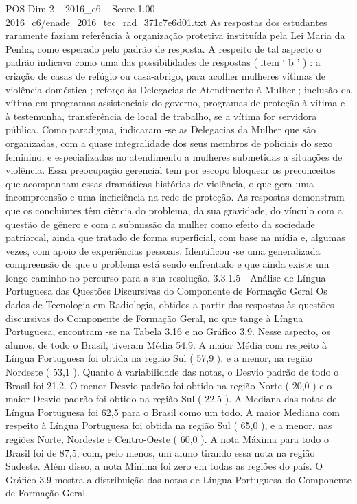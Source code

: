 \begin{textsample}{POS Dim 2 – 2016\_c6 – Score 1.00 – 2016\_c6/enade\_2016\_tec\_rad\_371c7e6d01.txt}
As respostas dos estudantes raramente faziam referência à organização protetiva instituída pela Lei Maria da Penha, como esperado pelo padrão de resposta.
A respeito de tal aspecto o padrão indicava como uma das possibilidades de respostas ( item ‘ b ’ ) : a criação de casas de refúgio ou casa-abrigo, para acolher mulheres vítimas de violência doméstica ; reforço às Delegacias de Atendimento à Mulher ; inclusão da vítima em programas assistenciais do governo, programas de proteção à vítima e à testemunha, transferência de local de trabalho, se a vítima for servidora pública.
Como paradigma, indicaram -se as Delegacias da Mulher que são organizadas, com a quase integralidade dos seus membros de policiais do sexo feminino, e especializadas no atendimento a mulheres submetidas a situações de violência.
Essa preocupação gerencial tem por escopo bloquear os preconceitos que acompanham essas dramáticas histórias de violência, o que gera uma incompreensão e uma ineficiência na rede de proteção.
As respostas demonstram que os concluintes têm ciência do problema, da sua gravidade, do vínculo com a questão de gênero e com a submissão da mulher como efeito da sociedade patriarcal, ainda que tratado de forma superficial, com base na mídia e, algumas vezes, com apoio de experiências pessoais.
Identificou -se uma generalizada compreensão de que o problema está sendo enfrentado e que ainda existe um longo caminho no percurso para a sua resolução. 3.3.1.5 - Análise de Língua Portuguesa das Questões Discursivas do Componente de Formação Geral Os dados de Tecnologia em Radiologia, obtidos a partir das respostas às questões discursivas do Componente de Formação Geral, no que tange à Língua Portuguesa, encontram -se na Tabela 3.16 e no Gráfico 3.9.
Nesse aspecto, os alunos, de todo o Brasil, tiveram Média 54,9.
A maior Média com respeito à Língua Portuguesa foi obtida na região Sul ( 57,9 ), e a menor, na região Nordeste ( 53,1 ).
Quanto à variabilidade das notas, o Desvio padrão de todo o Brasil foi 21,2.
O menor Desvio padrão foi obtido na região Norte ( 20,0 ) e o maior Desvio padrão foi obtido na região Sul ( 22,5 ).
A Mediana das notas de Língua Portuguesa foi 62,5 para o Brasil como um todo.
A maior Mediana com respeito à Língua Portuguesa foi obtida na região Sul ( 65,0 ), e a menor, nas regiões Norte, Nordeste e Centro-Oeste ( 60,0 ).
A nota Máxima para todo o Brasil foi de 87,5, com, pelo menos, um aluno tirando essa nota na região Sudeste.
Além disso, a nota Mínima foi zero em todas as regiões do país.
O Gráfico 3.9 mostra a distribuição das notas de Língua Portuguesa do Componente de Formação Geral.

\end{textsample}
